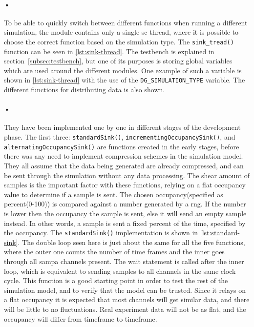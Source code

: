\documentclass[a4paper, 12pt]{report}
\newcommand{\codeword}[1]{\texttt{#1}}
\begin{document}
\paragraph{•} 
To be able to quickly switch between different functions when running a different simulation, the module contains only a single \gls{sc} thread, where it is possible to choose the correct function based on the simulation type.
The \codeword{sink\_tread()} function can be seen in \ref{lst:sink-thread}.
The testbench is explained in section~\ref{subsec:testbench}, but one of its purposes is storing global variables which are used around the different modules.
One example of such a variable is shown in \ref{lst:sink-thread} with the use of the \codeword{DG\_SIMULATION\_TYPE} variable.
The different functions for distributing data is also shown.

\begin{minipage}{\linewidth}

\end{minipage}

\paragraph{•}
They have been implemented one by one in different stages of the development phase.
The first three: \codeword{standardSink()}, \codeword{incrementingOccupancySink()}, and \codeword{alternatingOccupancySink()} are functions created in the early stages, before there was any need to implement compression schemes in the simulation model.
They all assume that the data being generated are already compressed, and can be sent through the simulation without any data processing.
The shear amount of samples is the important factor with these functions, relying on a flat occupancy value to determine if a sample is sent.
The chosen occupancy(specified as percent(0-100)) is compared against a number generated by a \gls{rng}.
If the number is lower then the occupancy the sample is sent, else it will send an empty sample instead.
In other words, a sample is sent a fixed percent of the time, specified by the occupancy.
The \codeword{standardSink()} implementation is shown in \ref{lst:standard-sink}.
The double loop seen here is just about the same for all the five functions, where the outer one counts the number of time frames and the inner goes through all \gls{sampa} channels present.
The wait statement is called after the inner loop, which is equivalent to sending samples to all channels in the same clock cycle.
This function is a good starting point in order to test the rest of the simulation model, and to verify that the model can be trusted.
Since it relays on a flat occupancy it is expected that most channels will get similar data, and there will be little to no fluctuations.
Real experiment data will not be as flat, and the occupancy will differ from timeframe to timeframe.
\end{document}
